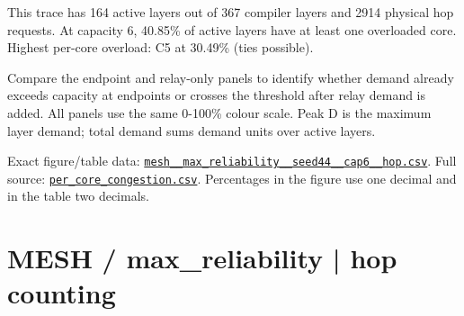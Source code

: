 \documentclass[10pt,a4paper]{article}
\begin{document}
This trace has 164 active layers out of 367 compiler layers and 2914 physical hop requests. At capacity 6, 40.85\% of active layers have at least one overloaded core. Highest per-core overload: C5 at 30.49\% (ties possible).\par
Compare the endpoint and relay-only panels to identify whether demand already exceeds capacity at endpoints or crosses the threshold after relay demand is added. All panels use the same 0-100\% colour scale. Peak D is the maximum layer demand; total demand sums demand units over active layers.\par
Exact figure/table data: \href{\detokenize{file:///home/dhruv-pansuriya/Documents/BTP/Compiler-Driven-ACE/output/pdf/qaoa_methods_congestion/tables/mesh__max_reliability__seed44__cap6__hop.csv}}{\nolinkurl{mesh__max_reliability__seed44__cap6__hop.csv}}. Full source: \href{\detokenize{file:///home/dhruv-pansuriya/Documents/BTP/Compiler-Driven-ACE/results/qaoa_2seed_2026-10-26/congestion/per_core_congestion.csv}}{\nolinkurl{per_core_congestion.csv}}. Percentages in the figure use one decimal and in the table two decimals.\par
\clearpage
\section*{MESH / max\_reliability | hop counting}
\end{document}
